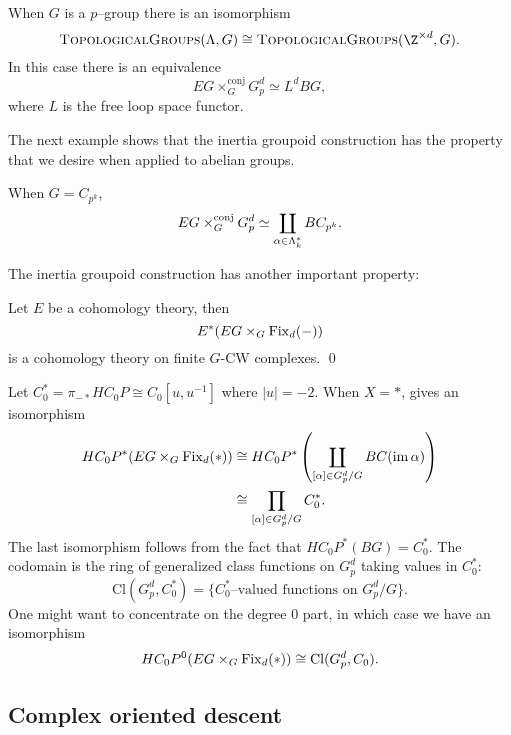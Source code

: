 \begin{example}
When $G$ is a $p$--group there is an isomorphism
\[
\CatOf{TopologicalGroups}(\Lambda,G) \cong \CatOf{TopologicalGroups}(\Z^{\times d}, G).
\]
In this case there is an equivalence
\[
EG \times_{G}^{\mathrm{conj}} G_{p}^{d} \simeq L^dBG,
\]
where $L$ is the free loop space functor. 
\end{example}

The next example shows that the inertia groupoid construction has the property that we desire when applied to abelian groups.
\begin{example} \label{zpk}
When $G = C_{p^k}$,
\[
EG \times_{G}^{\text{conj}} G_{p}^{d} \simeq \coprod_{\alpha \in \Lambda_k^*} BC_{p^k}.
\]
\end{example}

The inertia groupoid construction has another important property: 
\begin{proposition}
Let $E$ be a cohomology theory, then
\[
E^*(EG \times_G \operatorname{Fix}_d(-))
\]
is a cohomology theory on finite $G$-CW complexes. \pushQED\qed \qedhere \popQED
\end{proposition}




\begin{example} \label{app:classfncs}
Let $C_{0}^{*} = \pi_{-*}HC_0P \cong C_0[u,u^{-1}]$ where $|u|=-2$. When $X = *$,  gives an isomorphism
\begin{align*}
HC_{0}P^*(EG \times_G \operatorname{Fix}_d(*)) &\cong HC_{0}P^{*}\left(\coprod_{[\alpha] \in G_{p}^{d}/G} BC(\operatorname{im} \alpha)\right) \\
&\cong \prod_{[\alpha] \in G_{p}^{d}/G}C_{0}^{*}.
\end{align*}
The last isomorphism follows from the fact that $HC_{0}P^{*}(BG) = C_{0}^{*}$. The codomain is the ring of generalized class functions on $G_{p}^{d}$ taking values in $C_{0}^{*}$:
\[
\mathrm{Cl}(G_{p}^{d}, C_{0}^{*}) = \{C_{0}^{*} \text{--valued functions on } G_{p}^{d}/G\}.
\]
One might want to concentrate on the degree $0$ part, in which case we have an isomorphism
\[
HC_{0}P^0(EG \times_G \operatorname{Fix}_d(*)) \cong \mathrm{Cl}(G_{p}^{d}, C_{0}).
\]
\end{example}


\subsection*{Complex oriented descent}

